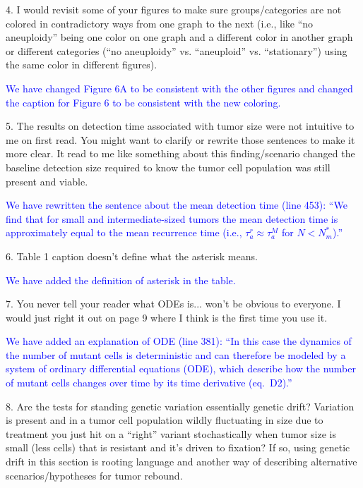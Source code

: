 \documentclass[12pt]{extarticle}
\begin{document}
4. I would revisit some of your figures to make sure groups/categories are not colored in contradictory ways from one graph to the next (i.e., like ``no aneuploidy'' being one color on one graph and a different color in another graph or different categories (``no aneuploidy'' vs. ``aneuploid'' vs. ``stationary'') using the same color in different figures).

\textcolor{blue}{ %
We have changed Figure 6A to be consistent with the other figures and changed the caption for Figure 6 to be consistent with the new coloring.
} 

5. The results on detection time associated with tumor size were not intuitive to me on first read. You might want to clarify or rewrite those sentences to make it more clear. It read to me like something about this finding/scenario changed the baseline detection size required to know the tumor cell population was still present and viable.

\textcolor{blue}{%
We have rewritten the sentence about the mean detection time (line 453): ``We find that for small and intermediate-sized tumors the mean detection time is approximately equal to the mean recurrence time (i.e., $\tau_a^r\approx\tau_a^{M}$ for $N<N_m^*$).''
} 

6. Table 1 caption doesn't define what the asterisk means.

\textcolor{blue}{ %
We have added the definition of asterisk in the table.
} 

7. You never tell your reader what ODEs is... won't be obvious to everyone. I would just right it out on page 9 where I think is the first time you use it.

\textcolor{blue}{%
We have added an explanation of ODE (line 381): ``In this case the dynamics of the number of mutant cells is deterministic and can therefore be modeled by a system of ordinary differential equations (ODE), which describe how the number of mutant cells changes over time by its time derivative (eq.~D2).''
} 

8. Are the tests for standing genetic variation essentially genetic drift? Variation is present and in a tumor cell population wildly fluctuating in size due to treatment you just hit on a ``right'' variant stochastically when tumor size is small (less cells) that is resistant and it's driven to fixation? If so, using genetic drift in this section is rooting language and another way of describing alternative scenarios/hypotheses for tumor rebound.
\end{document}
